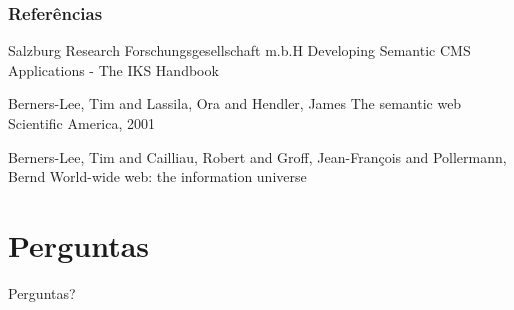 \documentclass{beamer}
\begin{document}
	\begin{frame}[allowframebreaks]
		\frametitle<presentation>{Referências}
		
		\begin{thebibliography}{10}
			
			\beamertemplatearticlebibitems
			
			Salzburg Research Forschungsgesellschaft m.b.H
			\newblock Developing Semantic CMS Applications - The IKS Handbook
			
			
			\beamertemplatearticlebibitems
			Berners-Lee, Tim and Lassila, Ora and Hendler, James
			\newblock The semantic web
			\newblock  Scientific America, 2001
			
			
			
			\beamertemplatearticlebibitems
			Berners-Lee, Tim and Cailliau, Robert and Groff, Jean-François and Pollermann, Bernd
			\newblock World-wide web: the information universe
			
			
			
		\end{thebibliography}
		
	\end{frame}
	
	
	\section*{Perguntas}
	\begin{frame}{  }
		\Large   \centering   Perguntas?
	\end{frame}
\end{document}
